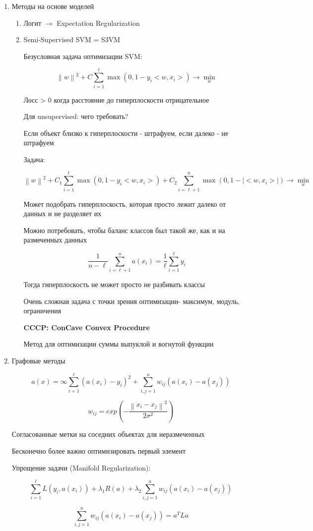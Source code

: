 \documentclass[a4paper, 12pt]{article}
\newcommand\norm[1]{\left\lVert#1\right\rVert}
\begin{document}
\begin{enumerate}
    \item Методы на основе моделей
    
    \begin{enumerate}
        \item Логит $\rightarrow$ Expectation Regularization
        \item Semi-Supervised SVM = S3VM
        
        Безусловная задача оптимизации SVM:

        \[\norm{w}^2 + C\sum_{i = 1}^{\ell}\max(0, 1 - y_i<w, x_i>) 
        \rightarrow \min_{w}\]

        Лосс > 0 когда расстояние до гиперплоскости отрицательное

        Для unsupervised: чего требовать?

        Если объект близко к гиперплоскости - штрафуем, 
        если далеко - не штрафуем
        
        Задача:

        \[\norm{w}^2 + C_1 \sum_{i = 1}^{\ell} \max(0, 1 - y_i<w, x_i>)
        + C_2 \sum_{i = \ell + 1}^n \max(0, 1 - \mid<w, x_i>\mid)
        \rightarrow \min_{w}\]

        Может подобрать гиперплоскость, которая просто лежит
        далеко от данных и не разделяет их

        Можно потребовать, чтобы баланс классов был такой же,
        как и на размеченных данных

        \[\frac{1}{n - \ell} \sum_{i = \ell + 1}^n a(x_i)
        = \frac{1}{\ell} \sum_{i = 1}^{\ell} y_i\]

        Тогда гиперплоскость не может просто не разбивать классы

        Очень сложная задача с точки зрения оптимизации- 
        максимум, модуль, ограничения

        \textbf{CCCP: ConCave Convex Procedure}
        
        Метод для оптимизации суммы выпуклой и вогнутой функции
    \end{enumerate}
    \item Графовые методы
    
    \[a(x) = \infty \sum_{i = 1}^{\ell} (a(x_i) - y_i)^2 +
    \sum_{i, j = 1}^n w_{ij}(a(x_i) - a(x_j))\]

    \[w_{ij} = exp \left(- \frac{\norm{x_i - x_j}^2}
    {2\sigma^2}\right)\]

    Согласованные метки на соседних объектах для неразмеченных

    Бесконечно более важно оптимизировать первый элемент

    Упрощение задачи (Manifold Regularization):

    \[\sum_{i = 1}^{\ell} L(y_i, a(x_i)) +
    \lambda_1 R(a) + 
    \lambda_2 \sum_{i, j = 1}^n w_{ij}(a(x_i) - a(x_j))\]

    \[\sum_{i, j = 1}^n w_{ij}(a(x_i) - a(x_j)) = a^T L a\]
\end{enumerate}
\end{document}
